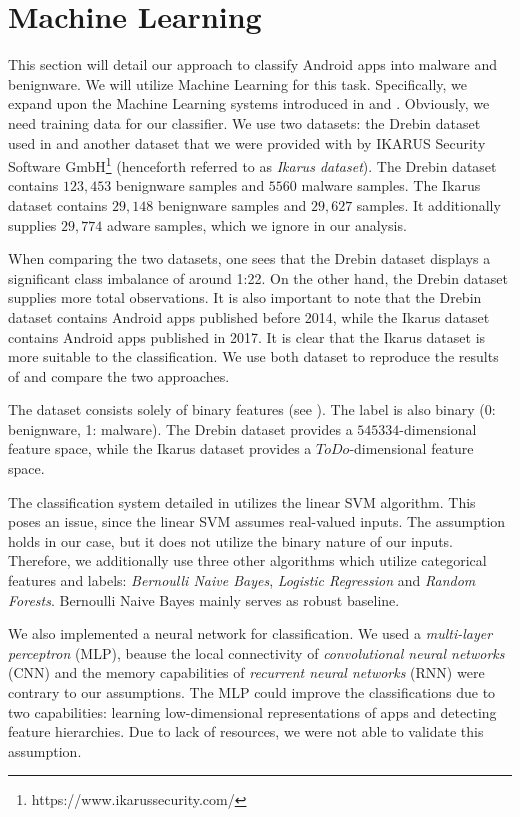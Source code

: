 \section{Machine Learning}
This section will detail our approach to classify Android apps into malware and benignware. We will utilize Machine Learning for this task. Specifically, we expand upon the Machine Learning systems introduced in \cite{drebin} and \cite{7917369}. 
Obviously, we need training data for our classifier. We use two datasets: the Drebin dataset used in \cite{drebin} and another dataset that we were provided with by IKARUS Security Software GmbH\footnote{https://www.ikarussecurity.com/} (henceforth referred to as \emph{Ikarus dataset}). The Drebin dataset contains $123,453$ benignware samples and $5560$ malware samples. The Ikarus dataset contains $29,148$ benignware samples and $29,627$ samples. It additionally supplies $29,774$ adware samples, which we ignore in our analysis.

When comparing the two datasets, one sees that the Drebin dataset displays a significant class imbalance of around 1:22. On the other hand, the Drebin dataset supplies more total observations. It is also important to note that the Drebin dataset contains Android apps published before 2014, while the Ikarus dataset contains Android apps published in 2017. It is clear that the Ikarus dataset is more suitable to the classification. We use both dataset to reproduce the results of \cite{drebin} and compare the two approaches.

The dataset consists solely of binary features (see ). The label is also binary (0: benignware, 1: malware). The Drebin dataset provides a $545334$-dimensional feature space, while the Ikarus dataset provides a $ToDo$-dimensional feature space.

The classification system detailed in \cite{drebin} utilizes the linear SVM algorithm. This poses an issue, since the linear SVM assumes real-valued inputs. The assumption holds in our case, but it does not utilize the binary nature of our inputs. Therefore, we additionally use three other algorithms which utilize categorical features and labels: \emph{Bernoulli Naive Bayes}, \emph{Logistic Regression} and \emph{Random Forests}. Bernoulli Naive Bayes mainly serves as robust baseline.

We also implemented a neural network for classification. We used a \emph{multi-layer perceptron} (MLP), beause the local connectivity of \emph{convolutional neural networks} (CNN) and the memory capabilities of \emph{recurrent neural networks} (RNN) were contrary to our assumptions. The MLP could improve the classifications due to two capabilities: learning low-dimensional representations of apps and detecting feature hierarchies. Due to lack of resources, we were not able to validate this assumption.